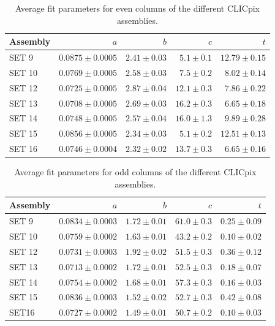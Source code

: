 \begin{table}[h!]
\centering
\begin{tabular}{ l r r r r}
\hline
Assembly & $a$ & $b$ & $c$ & $t$ \\ 
\hline
SET 9   & $0.0875 \pm 0.0005$ & $2.41 \pm 0.03$ & $5.1 \pm 0.1$ & $12.79 \pm 0.15$ \\
SET 10 & $0.0769 \pm 0.0005$ & $2.58 \pm 0.03$ & $7.5 \pm 0.2$ & $8.02 \pm 0.14$ \\
SET 12 & $0.0725 \pm 0.0005$ & $2.87 \pm 0.04$ & $12.1 \pm 0.3$ & $7.86 \pm 0.22$  \\
SET 13 & $0.0708 \pm 0.0005$ & $2.69 \pm 0.03$ & $16.2 \pm 0.3$ & $6.65 \pm 0.18$ \\
SET 14 & $0.0748 \pm 0.0005$ & $2.57 \pm 0.04$ & $16.0 \pm 1.3$ & $9.89 \pm 0.28$ \\
SET 15 & $0.0856 \pm 0.0005$ & $2.34 \pm 0.03$ & $5.1 \pm 0.2$ & $12.51 \pm 0.13$ \\
SET 16 & $0.0746 \pm 0.0004$ & $2.32 \pm 0.02$ & $13.7 \pm 0.3$ & $6.65\pm 0.16$ \\
\hline
\end{tabular}
\caption[Average fit parameters for even columns of CLICpix sensor.]{Average fit parameters for even columns of the different CLICpix assemblies.}
\label{table:clicpixfitparamseven}
\end{table}

\begin{table}[h!]
\centering
\begin{tabular}{ l r r r r}
\hline
Assembly & $a$ & $b$ & $c$ & $t$ \\ 
\hline
SET 9   & $0.0834 \pm 0.0003$ & $1.72 \pm 0.01$ & $61.0 \pm 0.3$ & $0.25 \pm 0.09$ \\
SET 10 & $0.0759 \pm 0.0002$ & $1.63 \pm 0.01$ & $43.2 \pm 0.2$ & $0.10 \pm 0.02$ \\
SET 12 & $0.0731 \pm 0.0003$ & $1.92 \pm 0.02$ & $51.5 \pm 0.3$ & $0.36 \pm 0.12$ \\
SET 13 & $0.0713 \pm 0.0002$ & $1.72 \pm 0.01$ & $52.5 \pm 0.3$ & $0.18 \pm 0.07$ \\
SET 14 & $0.0754 \pm 0.0002$ & $1.68 \pm 0.01$ & $57.3 \pm 0.3$ & $0.16 \pm 0.03$ \\
SET 15 & $0.0836 \pm 0.0003$ & $1.52 \pm 0.02$ & $52.7 \pm 0.3$ & $0.42 \pm 0.08$ \\
SET16  & $0.0727 \pm 0.0002$ & $1.49 \pm 0.01$ & $50.7 \pm 0.2$ & $0.10 \pm 0.03$ \\
\hline
\end{tabular}
\caption[Average fit parameters for odd columns of CLICpix sensor.]{Average fit parameters for odd columns of the different CLICpix assemblies.}
\label{table:clicpixfitparamsodd}
\end{table}

